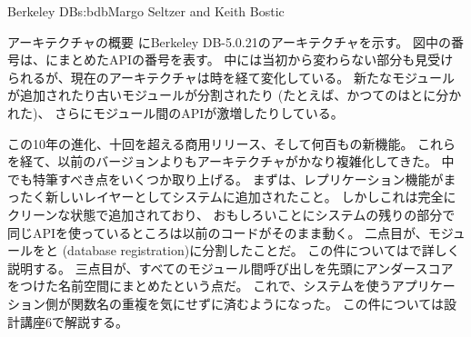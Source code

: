 \begin{aosachapter}{Berkeley DB}{s:bdb}{Margo Seltzer and Keith Bostic}
\begin{aosasect1}{アーキテクチャの概要}
にBerkeley DB-5.0.21のアーキテクチャを示す。
図中の番号は、にまとめたAPIの番号を表す。
中には当初から変わらない部分も見受けられるが、現在のアーキテクチャは時を経て変化している。
新たなモジュールが追加されたり古いモジュールが分割されたり
(たとえば、かつてのはとに分かれた)、
さらにモジュール間のAPIが激増したりしている。

この10年の進化、十回を超える商用リリース、そして何百もの新機能。
これらを経て、以前のバージョンよりもアーキテクチャがかなり複雑化してきた。
中でも特筆すべき点をいくつか取り上げる。
まずは、レプリケーション機能がまったく新しいレイヤーとしてシステムに追加されたこと。
しかしこれは完全にクリーンな状態で追加されており、
おもしろいことにシステムの残りの部分で同じAPIを使っているところは以前のコードがそのまま動く。
二点目が、モジュールをと (database registration)に分割したことだ。
この件についてはで詳しく説明する。
三点目が、すべてのモジュール間呼び出しを先頭にアンダースコアをつけた名前空間にまとめたという点だ。
これで、システムを使うアプリケーション側が関数名の重複を気にせずに済むようになった。
この件については設計講座6で解説する。


\end{aosasect1}
\end{aosachapter}
